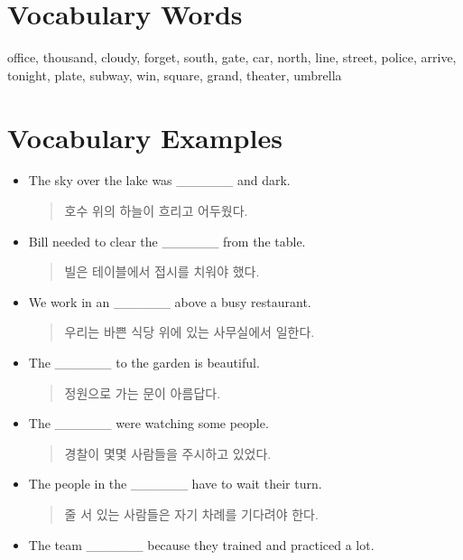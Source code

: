 \documentclass{article}
\begin{document}
\renewcommand{\familydefault}{\sfdefault}
\onehalfspacing
\fontsize{12pt}{14pt}\selectfont

\section*{Vocabulary Words}
\begin{addmargin}[1em]{1em}
office, thousand, cloudy, forget, south, gate, car, north, line, street, police, arrive, tonight, plate, subway, win, square, grand, theater, umbrella
\end{addmargin}

\section*{Vocabulary Examples}
\begin{addmargin}[1em]{1em}
\begin{itemize}
    \item The sky over the lake was \_\_\_\_\_\_ and dark.
    \begin{quote}
    호수 위의 하늘이 흐리고 어두웠다.
    \end{quote}
    \item Bill needed to clear the \_\_\_\_\_\_ from the table.
    \begin{quote}
    빌은 테이블에서 접시를 치워야 했다.
    \end{quote}
    \item We work in an \_\_\_\_\_\_ above a busy restaurant.
    \begin{quote}
    우리는 바쁜 식당 위에 있는 사무실에서 일한다.
    \end{quote}
    \item The \_\_\_\_\_\_ to the garden is beautiful.
    \begin{quote}
    정원으로 가는 문이 아름답다.
    \end{quote}
    \item The \_\_\_\_\_\_ were watching some people.
    \begin{quote}
    경찰이 몇몇 사람들을 주시하고 있었다.
    \end{quote}
    \item The people in the \_\_\_\_\_\_ have to wait their turn.
    \begin{quote}
    줄 서 있는 사람들은 자기 차례를 기다려야 한다.
    \end{quote}
    \item The team \_\_\_\_\_\_ because they trained and practiced a lot.

\end{itemize}
\end{addmargin}
\end{document}
